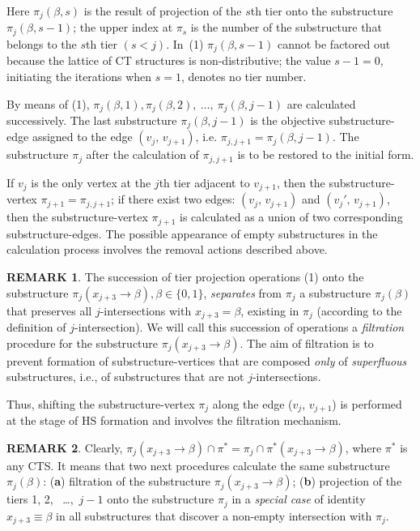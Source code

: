 \documentclass[12pt, a4paper]{article}
\begin{document}
Here $\pi_j(\beta,s)$ is the result of projection of the $s$th tier onto the substructure $\pi_j(\beta,s-1)$; the upper index at $\pi_s$  is the number of the substructure that belongs to the $s$th tier $(s<j)$. In~(1) $\pi_j(\beta,s-1)$ cannot be factored out because the lattice of CT structures is non-distributive; the value $s-1=0$,
initiating the iterations when $s=1$, denotes no tier number.

By means of (1), $\pi_j(\beta,1), \pi_j(\beta,2), \ \dots ,\ \pi_j(\beta, j-1)$ are calculated successively. The last substructure  $\pi_j(\beta, j-1)$ is the objective substructure-edge assigned to the edge $(v_j,\,v_{j+1})$, i.e. $\pi_{j,j+1}=\pi_j(\beta, j-1)$.
The substructure $\pi_j$ after the calculation of $\pi_{j,j+1}$ is to be restored to the initial form.

If $v_j$ is the only vertex at the $j$th tier adjacent to $v_{j+1}$, then the substructure-vertex $\pi_{j+1} = \pi_{j,j+1}$;
if there exist two edges:  $(v_j,\,v_{j+1})$ and $(v_j',\,v_{j+1})$, then the substructure-vertex $\pi_{j+1}$ is calculated as a
union of two corresponding substructure-edges. The possible appearance of empty substructures in the calculation process involves the removal actions described above.

{\bf REMARK 1}. The succession of tier projection operations (1) onto the substructure  $\pi_j(x_{j+3}\to \beta), \beta\in \{0,1\}$,
{\it separates} from  $\pi_j$ a substructure $\pi_j(\beta)$ that preserves all  $j$-intersections with $x_{j+3}=\beta$, existing in $\pi_j$ (according to the definition of  $j$-intersection). We will call this succession of operations a {\it filtration} procedure for the substructure $\pi_j(x_{j+3}\to \beta)$. The aim of filtration is to prevent formation of substructure-vertices that are composed {\em only} of {\it superfluous} substructures, i.e., of substructures that are not $j$-intersections.

Thus, shifting the substructure-vertex $\pi_j$ along the edge ($v_j$,  $v_{j+1}$) is performed at the stage of HS formation and involves the filtration mechanism.

{\bf REMARK 2}. Clearly, $\pi_j(x_{j+3}\to \beta)\cap \pi^* = \pi_j\cap \pi^*(x_{j+3}\to \beta)$,  where $\pi^*$ is any CTS. It means that two next procedures calculate the same substructure $\pi_j(\beta)$: ({\bf a}) filtration of the substructure $\pi_j(x_{j+3}\to \beta)$; ({\bf b}) projection of the tiers 1, 2, \ \dots ,\ $j-1$ onto the substructure $\pi_j$ in a {\it special case} of identity $x_{j+3}\equiv \beta$ in all substructures that discover a non-empty intersection with $\pi_j$.
\end{document}
